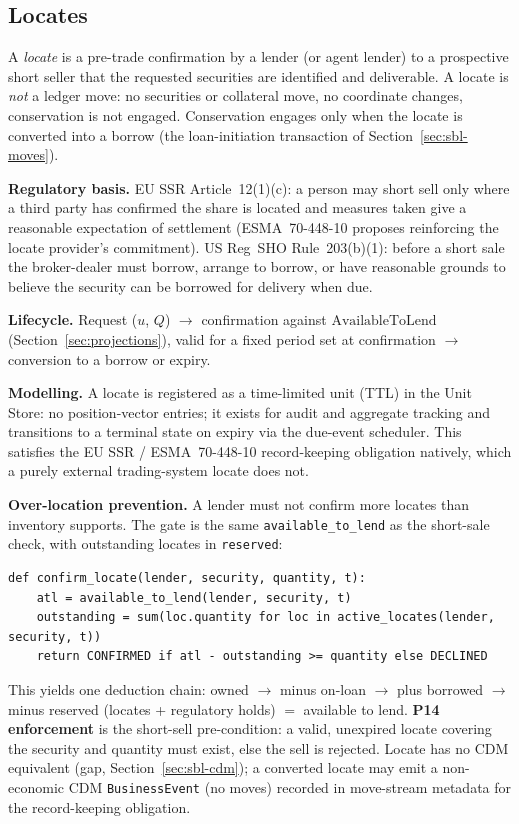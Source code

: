 \subsection{Locates}
\label{sec:sbl-locates}

A \emph{locate} is a pre-trade confirmation by a lender (or agent lender) to a prospective short seller that the requested securities are identified and deliverable. A locate is \emph{not} a ledger move: no securities or collateral move, no coordinate changes, conservation is not engaged. Conservation engages only when the locate is converted into a borrow (the loan-initiation transaction of Section~\ref{sec:sbl-moves}).

\noindent\textbf{Regulatory basis.} EU SSR Article~12(1)(c): a person may short sell only where a third party has confirmed the share is located and measures taken give a reasonable expectation of settlement (ESMA~70-448-10 proposes reinforcing the locate provider's commitment). US Reg~SHO Rule~203(b)(1): before a short sale the broker-dealer must borrow, arrange to borrow, or have reasonable grounds to believe the security can be borrowed for delivery when due.

\noindent\textbf{Lifecycle.} Request ($u$, $Q$) $\to$ confirmation against $\text{AvailableToLend}$ (Section~\ref{sec:projections}), valid for a fixed period set at confirmation $\to$ conversion to a borrow or expiry.

\noindent\textbf{Modelling.} A locate is registered as a time-limited unit (TTL) in the Unit Store: no position-vector entries; it exists for audit and aggregate tracking and transitions to a terminal state on expiry via the due-event scheduler. This satisfies the EU SSR / ESMA~70-448-10 record-keeping obligation natively, which a purely external trading-system locate does not.

\noindent\textbf{Over-location prevention.} A lender must not confirm more locates than inventory supports. The gate is the same \texttt{available\_to\_lend} as the short-sale check, with outstanding locates in \texttt{reserved}:
\begin{lstlisting}
def confirm_locate(lender, security, quantity, t):
    atl = available_to_lend(lender, security, t)
    outstanding = sum(loc.quantity for loc in active_locates(lender, security, t))
    return CONFIRMED if atl - outstanding >= quantity else DECLINED
\end{lstlisting}
This yields one deduction chain: owned $\to$ minus on-loan $\to$ plus borrowed $\to$ minus reserved (locates + regulatory holds) $=$ available to lend. \textbf{P14 enforcement} is the short-sell pre-condition: a valid, unexpired locate covering the security and quantity must exist, else the sell is rejected. Locate has no CDM equivalent (gap, Section~\ref{sec:sbl-cdm}); a converted locate may emit a non-economic CDM \texttt{BusinessEvent} (no moves) recorded in move-stream metadata for the record-keeping obligation.

